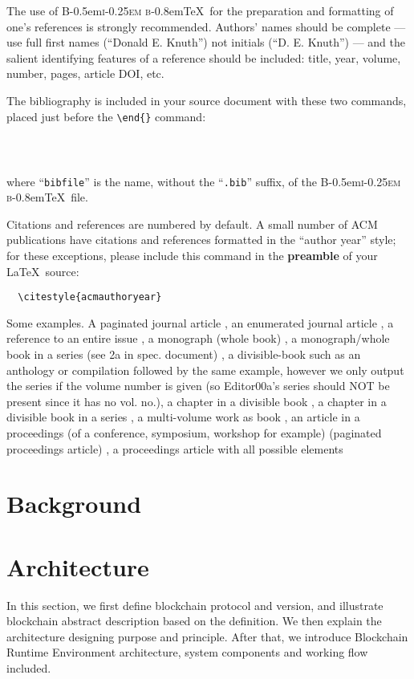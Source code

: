\documentclass[sigplan,screen]{acmart}
\providecommand\BibTeX{{%
    \normalfont B\kern-0.5em{\scshape i\kern-0.25em b}\kern-0.8em\TeX}}}
\begin{document}
The use of \BibTeX\ for the preparation and formatting of one's
references is strongly recommended. Authors' names should be complete
--- use full first names (``Donald E. Knuth'') not initials
(``D. E. Knuth'') --- and the salient identifying features of a
reference should be included: title, year, volume, number, pages,
article DOI, etc.

The bibliography is included in your source document with these two
commands, placed just before the \verb|\end{}| command:
\begin{verbatim}
  
  
\end{verbatim}
where ``\verb|bibfile|'' is the name, without the ``\verb|.bib|''
suffix, of the \BibTeX\ file.

Citations and references are numbered by default. A small number of
ACM publications have citations and references formatted in the
``author year'' style; for these exceptions, please include this
command in the {\bfseries preamble} of your \LaTeX\ source:
\begin{verbatim}
  \citestyle{acmauthoryear}
\end{verbatim}

  Some examples.  A paginated journal article \cite{Abril07}, an
  enumerated journal article \cite{Cohen07}, a reference to an entire
  issue \cite{JCohen96}, a monograph (whole book) \cite{Kosiur01}, a
  monograph/whole book in a series (see 2a in spec. document)
  \cite{Harel79}, a divisible-book such as an anthology or compilation
  \cite{Editor00} followed by the same example, however we only output
  the series if the volume number is given \cite{Editor00a} (so
  Editor00a's series should NOT be present since it has no vol. no.),
  a chapter in a divisible book \cite{Spector90}, a chapter in a
  divisible book in a series \cite{Douglass98}, a multi-volume work as
  book \cite{Knuth97}, an article in a proceedings (of a conference,
  symposium, workshop for example) (paginated proceedings article)
  \cite{Andler79}, a proceedings article with all possible elements

\section{Background}

\section{Architecture}
In this section, we first define blockchain protocol and version, and illustrate
blockchain abstract description based on the definition. We then explain the
architecture designing purpose and principle. After that, we introduce Blockchain
Runtime Environment architecture, system components and working flow included.
\end{document}

